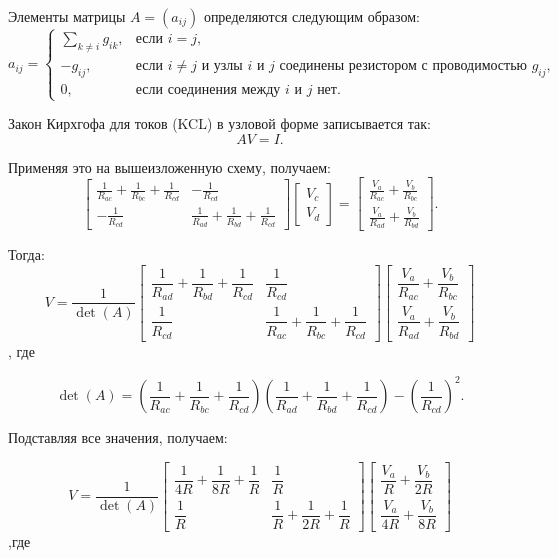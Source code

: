 \documentclass[12pt,a4paper]{article}
\begin{document}
	Элементы матрицы $A = (a_{ij})$ определяются следующим образом:
	\[
	a_{ij} =
	\begin{cases}
		\displaystyle \sum\limits_{k \neq i} g_{ik}, & \text{если } i=j, \\[1.5ex]
		\displaystyle -g_{ij}, & \text{если } i \neq j \text{ и узлы $i$ и $j$ соединены резистором с проводимостью } g_{ij}, \\[1.5ex]
		0, & \text{если соединения между $i$ и $j$ нет.}
	\end{cases}
	\]
	
	Закон Кирхгофа для токов (KCL) в узловой форме записывается так:
	\[
	A V = I .
	\]
	
	Применяя это на вышеизложенную схему, получаем:
	\[
	\begin{bmatrix}
		\frac{1}{R_{ac}} + \frac{1}{R_{bc}} + \frac{1}{R_{cd}} & -\frac{1}{R_{cd}} \\[2ex]
		-\frac{1}{R_{cd}} & \frac{1}{R_{ad}} + \frac{1}{R_{bd}} + \frac{1}{R_{cd}}
	\end{bmatrix}
	\begin{bmatrix} V_c \\ V_d \end{bmatrix}
	=
	\begin{bmatrix}
		\frac{V_a}{R_{ac}} + \frac{V_b}{R_{bc}} \\[2ex]
		\frac{V_a}{R_{ad}} + \frac{V_b}{R_{bd}}
	\end{bmatrix}.
	\]
	
	Тогда:
	\[V = \frac{1}{\det(A)}
	\begin{bmatrix}
		\dfrac{1}{R_{ad}} + \dfrac{1}{R_{bd}} + \dfrac{1}{R_{cd}} & \dfrac{1}{R_{cd}} \\[2ex]
		\dfrac{1}{R_{cd}} & \dfrac{1}{R_{ac}} + \dfrac{1}{R_{bc}} + \dfrac{1}{R_{cd}}
	\end{bmatrix}
	\begin{bmatrix}
		\dfrac{V_a}{R_{ac}} + \dfrac{V_b}{R_{bc}} \\[2ex]
		\dfrac{V_a}{R_{ad}} + \dfrac{V_b}{R_{bd}}
	\end{bmatrix}
	\], где
	
	\[\det(A) =
	\left(\dfrac{1}{R_{ac}} + \dfrac{1}{R_{bc}} + \dfrac{1}{R_{cd}}\right)
	\left(\dfrac{1}{R_{ad}} + \dfrac{1}{R_{bd}} + \dfrac{1}{R_{cd}}\right)
	- \left(\dfrac{1}{R_{cd}}\right)^2.
	\]
	
	Подставляя все значения, получаем:
	
	\[V = \frac{1}{\det(A)}
	\begin{bmatrix}
		\dfrac{1}{4R} + \dfrac{1}{8R} + \dfrac{1}{R} & \dfrac{1}{R} \\[2ex]
		\dfrac{1}{R} & \dfrac{1}{R} + \dfrac{1}{2R} + \dfrac{1}{R}
	\end{bmatrix}
	\begin{bmatrix}
		\dfrac{V_a}{R} + \dfrac{V_b}{2R} \\[2ex]
		\dfrac{V_a}{4R} + \dfrac{V_b}{8R}
	\end{bmatrix}
	\],где
	
\end{document}
